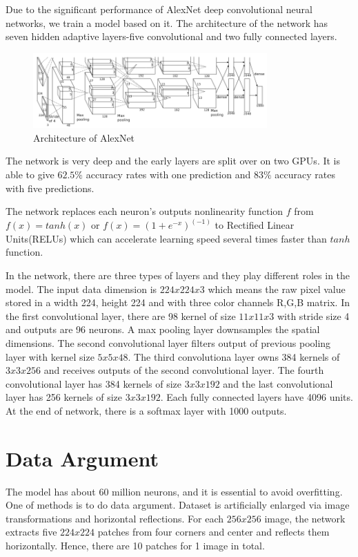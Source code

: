 Due to the significant performance of AlexNet \citep{krizhevsky2012imagenet} deep convolutional neural networks, we train a model based on it. The architecture of the network has seven hidden adaptive layers-five convolutional and two fully connected layers.
\begin{figure}[!htb]
    \centering
	\includegraphics[width=0.8\textwidth]{AlexNet.png}
    \caption{Architecture of AlexNet}%
    \label{fig:ImageNetArch}%
\end{figure}
The network is very deep and the early layers are split over on two GPUs. It is able to give $62.5\%$ accuracy rates with one prediction and $83\%$ accuracy rates with five predictions.

The network replaces each neuron's outputs nonlinearity function $f$ from $f(x) = tanh(x)$ or $f(x) = (1 + e^{-x})^(-1)$ to Rectified Linear Units(RELUs)\citep{nair2010rectified} which can accelerate learning speed several times faster than $tanh$ function. 

In the network, there are three types of layers and they play different roles in the model. The input data dimension is $224x224x3$ which means the raw pixel value stored in a width 224, height 224 and with three color channels R,G,B matrix. In the first convolutional layer, there are 98 kernel of size $11x11x3$ with stride size 4 and outputs are 96 neurons. A max pooling layer downsamples the spatial dimensions. The second convolutional layer filters output of previous pooling layer with kernel size $5x5x48$. The third convolutiona layer owns 384 kernels of $3x3x256$ and receives outputs of the second convolutional layer. The fourth convolutional layer has 384 kernels of size $3x3x192$ and the last convolutional layer has 256 kernels of size $3x3x192$. Each fully connected layers have 4096 units. At the end of network, there is a softmax layer with 1000 outputs.

\section{Data Argument}

The model has about 60 million neurons, and it is essential to avoid overfitting. One of methods is to do data argument. Dataset is artificially enlarged via image transformations and horizontal reflections. For each $256x256$ image, the network extracts five $224x224$ patches from four corners and center and reflects them horizontally. Hence, there are 10 patches for 1 image in total. 

